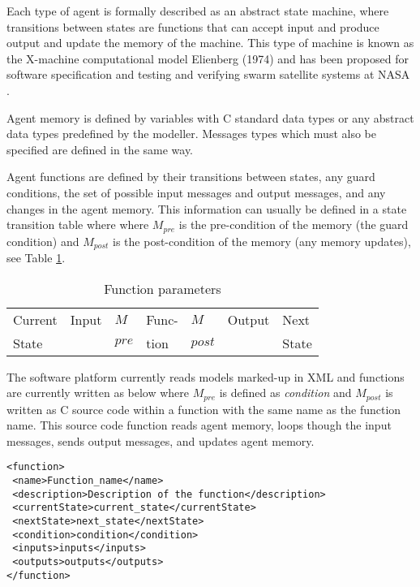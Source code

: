 \documentclass{aamas2009}
\newenvironment{mylisting}
{\begin{list}{}{\setlength{\leftmargin}{1em}}\item\small\bfseries}
{\end{list}}
\begin{document}
Each type of agent
is formally described as an abstract state machine, where transitions
between states are functions that can accept input and produce output and
update the memory of the machine. This type of machine is known as the
X-machine computational model Elienberg (1974) and has been proposed for
software specification and testing \cite{HOLCOMBE:1986} and verifying swarm
satellite systems at NASA \cite{162}.


Agent memory is defined by variables with C standard data types or any abstract
data types predefined by the modeller. Messages types which must also be
specified are defined in the same way.

Agent functions are defined by their transitions between states, any guard
conditions, the set of possible input messages and output messages, and any
changes in the agent memory. This information can usually be defined in a state
transition table where where $M_{pre}$ is the pre-condition of the memory (the
guard condition) and $M_{post}$ is the post-condition of the memory (any memory
updates), see Table \ref{tab:funcparameters}.

\begin{table}[hbp]
\centering
\begin{tabular}{|l|l|l||l||l|l|l|}
\hline
Current&Input&$M$&Func-&$M$&Output&Next\\
State&&$pre$&tion&$post$&&State\\
\hline
\end{tabular}
\caption{Function parameters} \label{tab:funcparameters}
\end{table}

The software platform currently reads models marked-up in XML and functions are
currently written as below where $M_{pre}$ is defined as \textit{condition} and
$M_{post}$ is written as C source code within a function with the same name as
the function name. This source code function reads agent memory, loops though
the input messages, sends output messages, and updates agent memory.

\begin{mylisting}
\begin{verbatim}
<function>
 <name>Function_name</name>
 <description>Description of the function</description>
 <currentState>current_state</currentState>
 <nextState>next_state</nextState>
 <condition>condition</condition>
 <inputs>inputs</inputs>
 <outputs>outputs</outputs>
</function>
\end{verbatim}
\end{mylisting}
\end{document}

